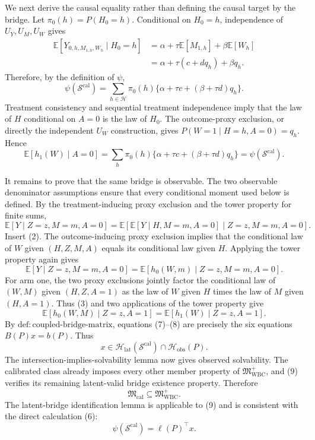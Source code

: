 We next derive the causal equality rather than defining the causal target by the
bridge.  Let \(\pi_0(h)=P(H_0=h)\).  Conditional on \(H_0=h\), independence of
\(U_Y,U_M,U_W\) gives
\[
 \begin{aligned}
 \mathbb E[Y_{0,h,M_{1,h},W_h}\mid H_0=h]
 &=\alpha+\tau\mathbb E[M_{1,h}]+\beta\mathbb E[W_h]\\
 &=\alpha+\tau(c+dq_h)+\beta q_h.
 \end{aligned}
 \tag{4}
\]
Therefore, by the definition of \(\psi\),
\[
 \psi(\mathcal S^{\mathrm{cal}})
 =\sum_{h\in\mathcal H}\pi_0(h)
   \{\alpha+\tau c+(\beta+\tau d)q_h\}.
 \tag{5}
\]
Treatment consistency and sequential treatment independence imply that the law of
\(H\) conditional on \(A=0\) is the law of \(H_0\).  The outcome-proxy exclusion,
or directly the independent \(U_W\) construction, gives
\(P(W=1\mid H=h,A=0)=q_h\).  Hence
\[
 \mathbb E[h_1(W)\mid A=0]
 =\sum_h\pi_0(h)\{\alpha+\tau c+(\beta+\tau d)q_h\}
 =\psi(\mathcal S^{\mathrm{cal}}).
 \tag{6}
\]

It remains to prove that the same bridge is observable.  The two observable
denominator assumptions ensure that every conditional moment used below is defined.
By the treatment-inducing proxy exclusion and the tower property for finite sums,
\[
 \mathbb E[Y\mid Z=z,M=m,A=0]
 =\mathbb E\!\left[\mathbb E[Y\mid H,M=m,A=0]
                    \mid Z=z,M=m,A=0\right].
\]
Insert (2).  The outcome-inducing proxy exclusion implies that the conditional law
of \(W\) given \((H,Z,M,A)\) equals its conditional law given \(H\).  Applying the
tower property again gives
\[
 \mathbb E[Y\mid Z=z,M=m,A=0]
 =\mathbb E[h_0(W,m)\mid Z=z,M=m,A=0].
 \tag{7}
\]
For arm one, the two proxy exclusions jointly factor the conditional law of
\((W,M)\) given \((H,Z,A=1)\) as the law of \(W\) given \(H\) times the law of
\(M\) given \((H,A=1)\).  Thus (3) and two applications of the tower property give
\[
 \mathbb E[h_0(W,M)\mid Z=z,A=1]
 =\mathbb E[h_1(W)\mid Z=z,A=1].
 \tag{8}
\]
By \(\mathrm{def{:}coupled\text{-}bridge\text{-}matrix}\), equations (7)--(8) are
precisely the six equations \(B(P)x=b(P)\).  Thus
\[
 x\in\mathcal H_{\mathrm{lat}}(\mathcal S^{\mathrm{cal}})
       \cap\mathcal H_{\mathrm{obs}}(P).
 \tag{9}
\]
The intersection-implies-solvability lemma now gives observed solvability.  The
calibrated class already imposes every other member property of
\(\mathfrak M_{\mathrm{WBC}}^+\), and (9) verifies its remaining latent-valid bridge
existence property.  Therefore
\[
 \mathfrak M_{\mathrm{cal}}\subseteq\mathfrak M_{\mathrm{WBC}}^+.
 \tag{10}
\]
The latent-bridge identification lemma is applicable to (9) and is consistent with
the direct calculation (6):
\[
 \psi(\mathcal S^{\mathrm{cal}})=\ell(P)^\top x.
 \tag{11}
\]

